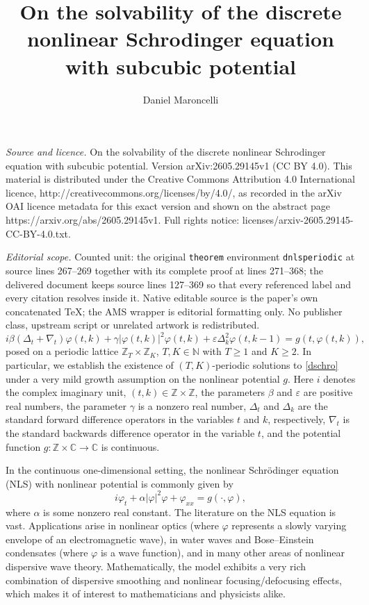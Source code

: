 \documentclass[10pt,a4paper]{amsart}
\newcommand{\N}{\mathbb{N}}
\newcommand{\C}{\mathbb{C}}
\newcommand{\Z}{\mathbb{Z}}
\newcommand{\be}{\begin{equation}}
\newcommand{\ee}{\end{equation}}
\newcommand{\ve}{\varepsilon}
\renewcommand{\phi}{\varphi}
\numberwithin{equation}{section}
\begin{document}
\title[On the solvability of the discrete nonlinear Schrodinger equ]{On the solvability of the discrete nonlinear Schrodinger equation with subcubic potential}
\author{Daniel Maroncelli}
\date{}
\maketitle
\noindent\emph{Source and licence.} On the solvability of the discrete nonlinear Schrodinger equation with subcubic potential. Version arXiv:2605.29145v1 (CC BY 4.0). This material is distributed under the Creative Commons Attribution 4.0 International licence, http://creativecommons.org/licenses/by/4.0/, as recorded in the arXiv OAI licence metadata for this exact version and shown on the abstract page https://arxiv.org/abs/2605.29145v1. Full rights notice: licenses/arxiv-2605.29145-CC-BY-4.0.txt.\par\smallskip
\noindent\textit{Editorial scope.} Counted unit: the original \texttt{theorem} environment \texttt{dnlsperiodic} at source lines 267--269 together with its complete proof at lines 271--368; the delivered document keeps source lines 127--369 so that every referenced label and every citation resolves inside it. Native editable source is the paper's own concatenated TeX; the AMS wrapper is editorial formatting only. No publisher class, upstream script or unrelated artwork is redistributed.
\be\label{dschro}
i\beta(\Delta_t+\nabla_t)\phi(t,k) +\gamma|\phi(t,k)|^2\phi(t,k)+\ve\Delta^2_k\phi(t,k-1)=g(t,\phi(t,k)),
\ee
posed on a periodic lattice $\Z_T\times \Z_K$, $T,K\in \N$ with $T\geq 1$ and $K\geq 2$. In particular, we establish the existence of $(T,K)$-periodic solutions to \eqref{dschro} under a very mild growth assumption on the nonlinear potential $g$.  Here $i$ denotes the complex imaginary unit, $(t,k)\in \Z\times \Z$, the parameters $\beta$ and $\ve$ are positive real numbers, the parameter $\gamma$ is a nonzero real number, $\Delta_t$ and $\Delta_k$ are the standard forward difference operators in the variables $t$ and $k$,  respectively, $\nabla_t$ is the standard backwards difference operator in the variable $t$, and the potential function $g:\Z\times \C\to \C$ is continuous.

In the continuous one-dimensional setting, the nonlinear Schr\"{o}dinger equation (NLS) with nonlinear potential is commonly given by
\be\label{cschro}
i\phi_t+\alpha|\phi|^2\phi+\phi_{xx}=g(\cdot, \phi),
\ee
where $\alpha$ is some nonzero real constant.
The literature on the NLS equation is vast. Applications arise in nonlinear optics (where $\phi$ represents a slowly varying envelope of an electromagnetic wave), in water waves and Bose–Einstein condensates (where $\phi$ is a wave function), and in many other areas of nonlinear dispersive wave theory. Mathematically, the model exhibits a very rich combination of dispersive smoothing and nonlinear focusing/defocusing effects, which makes it of interest to mathematicians and physicists alike.
\end{document}
